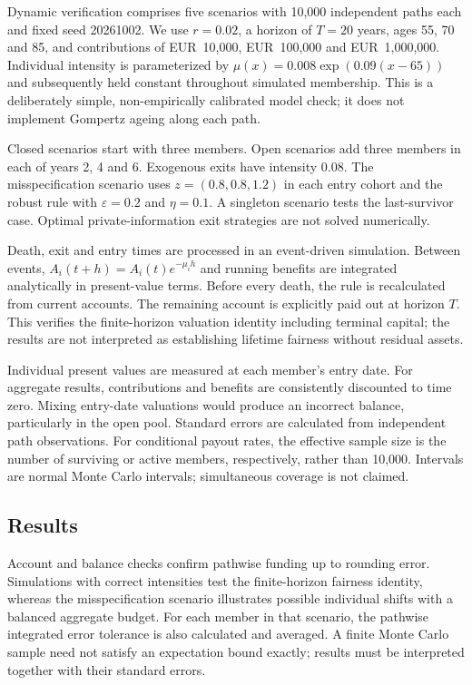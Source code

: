 \documentclass[11pt,a4paper]{article}
\theoremstyle{definition}\newtheorem{definition}[theorem]{Definition}
\theoremstyle{remark}\newtheorem{remark}[theorem]{Remark}
\begin{document}
Dynamic verification comprises five scenarios with 10,000 independent paths each and fixed seed 20261002. We use $r=0.02$, a horizon of $T=20$ years, ages 55, 70 and 85, and contributions of EUR~10,000, EUR~100,000 and EUR~1,000,000. Individual intensity is parameterized by $\mu(x)=0.008\exp(0.09(x-65))$ and subsequently held constant throughout simulated membership. This is a deliberately simple, non-empirically calibrated model check; it does not implement Gompertz ageing along each path.

Closed scenarios start with three members. Open scenarios add three members in each of years 2, 4 and 6. Exogenous exits have intensity 0.08. The misspecification scenario uses $z=(0.8,0.8,1.2)$ in each entry cohort and the robust rule with $\varepsilon=0.2$ and $\eta=0.1$. A singleton scenario tests the last-survivor case. Optimal private-information exit strategies are not solved numerically.

Death, exit and entry times are processed in an event-driven simulation. Between events, $A_i(t+h)=A_i(t)e^{-\mu_i h}$ and running benefits are integrated analytically in present-value terms. Before every death, the rule is recalculated from current accounts. The remaining account is explicitly paid out at horizon $T$. This verifies the finite-horizon valuation identity including terminal capital; the results are not interpreted as establishing lifetime fairness without residual assets.

Individual present values are measured at each member's entry date. For aggregate results, contributions and benefits are consistently discounted to time zero. Mixing entry-date valuations would produce an incorrect balance, particularly in the open pool. Standard errors are calculated from independent path observations. For conditional payout rates, the effective sample size is the number of surviving or active members, respectively, rather than 10,000. Intervals are normal Monte Carlo intervals; simultaneous coverage is not claimed.

\subsection{Results}

Account and balance checks confirm pathwise funding up to rounding error. Simulations with correct intensities test the finite-horizon fairness identity, whereas the misspecification scenario illustrates possible individual shifts with a balanced aggregate budget. For each member in that scenario, the pathwise integrated error tolerance is also calculated and averaged. A finite Monte Carlo sample need not satisfy an expectation bound exactly; results must be interpreted together with their standard errors.
\end{document}
